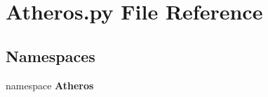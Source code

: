 \section{Atheros.py File Reference}
\label{Atheros_8py}
\subsection*{Namespaces}
\begin{CompactItemize}
\item 
namespace {\bf Atheros}
\end{CompactItemize}
